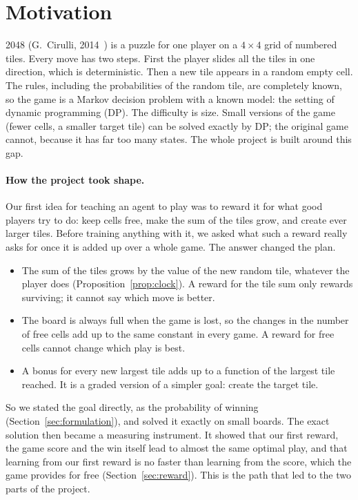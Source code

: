 \documentclass[11pt,a4paper]{article}
\theoremstyle{remark}
\begin{document}
\section{Motivation}

2048 (G.~Cirulli, 2014~\cite{cirulli2014}) is a puzzle for one player on a $4\times4$ grid of numbered tiles. Every move has two steps. First the player slides all the tiles in one direction, which is deterministic. Then a new tile appears in a random empty cell. The rules, including the probabilities of the random tile, are completely known, so the game is a Markov decision problem with a known model: the setting of dynamic programming (DP). The difficulty is size. Small versions of the game (fewer cells, a smaller target tile) can be solved exactly by DP; the original game cannot, because it has far too many states. The whole project is built around this gap.

\paragraph{How the project took shape.} Our first idea for teaching an agent to play was to reward it for what good players try to do: keep cells free, make the sum of the tiles grow, and create ever larger tiles. Before training anything with it, we asked what such a reward really asks for once it is added up over a whole game. The answer changed the plan.
\begin{itemize}[leftmargin=*]
\item The sum of the tiles grows by the value of the new random tile, whatever the player does (Proposition~\ref{prop:clock}). A reward for the tile sum only rewards surviving; it cannot say which move is better.
\item The board is always full when the game is lost, so the changes in the number of free cells add up to the same constant in every game. A reward for free cells cannot change which play is best.
\item A bonus for every new largest tile adds up to a function of the largest tile reached. It is a graded version of a simpler goal: create the target tile.
\end{itemize}
So we stated the goal directly, as the probability of winning (Section~\ref{sec:formulation}), and solved it exactly on small boards. The exact solution then became a measuring instrument. It showed that our first reward, the game score and the win itself lead to almost the same optimal play, and that learning from our first reward is no faster than learning from the score, which the game provides for free (Section~\ref{sec:reward}). This is the path that led to the two parts of the project.
\end{document}
